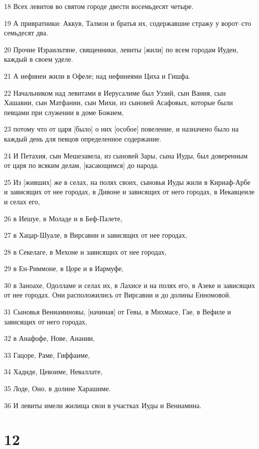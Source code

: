 \par 18 Всех левитов во святом городе двести восемьдесят четыре.
\par 19 А привратники: Аккув, Талмон и братья их, содержавшие стражу у ворот--сто семьдесят два.
\par 20 Прочие Израильтяне, священники, левиты [жили] по всем городам Иудеи, каждый в своем уделе.
\par 21 А нефинеи жили в Офеле; над нефинеями Циха и Гишфа.
\par 22 Начальником над левитами в Иерусалиме был Уззий, сын Вания, сын Хашавии, сын Матфании, сын Михи, из сыновей Асафовых, которые были певцами при служении в доме Божием,
\par 23 потому что от царя [было] о них [особое] повеление, и назначено было на каждый день для певцов определенное содержание.
\par 24 И Петахия, сын Мешезавела, из сыновей Зары, сына Иуды, был доверенным от царя по всяким делам, [касающимся] до народа.
\par 25 Из [живших] же в селах, на полях своих, сыновья Иуды жили в Кириаф-Арбе и зависящих от нее городах, в Дивоне и зависящих от него городах, в Иекавцеиле и селах его,
\par 26 в Иешуе, в Моладе и в Беф-Палете,
\par 27 в Хацар-Шуале, в Вирсавии и зависящих от нее городах,
\par 28 в Секелаге, в Мехоне и зависящих от нее городах,
\par 29 в Ен-Риммоне, в Цоре и в Иармуфе,
\par 30 в Заноахе, Одолламе и селах их, в Лахисе и на полях его, в Азеке и зависящих от нее городах. Они расположились от Вирсавии и до долины Енномовой.
\par 31 Сыновья Вениаминовы, [начиная] от Гевы, в Михмасе, Гае, в Вефиле и зависящих от него городах,
\par 32 в Анафофе, Нове, Анании,
\par 33 Гацоре, Раме, Гиффаиме,
\par 34 Хадиде, Цевоиме, Неваллате,
\par 35 Лоде, Оно, в долине Харашиме.
\par 36 И левиты имели жилища свои в участках Иуды и Вениамина.

\chapter{12}

